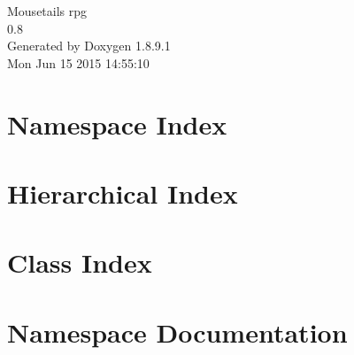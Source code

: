 \documentclass[twoside]{book}
\newcommand{\+}{\discretionary{\mbox{\scriptsize$\hookleftarrow$}}{}{}}
\newcommand{\clearemptydoublepage}{%
  \newpage{\pagestyle{empty}\cleardoublepage}%
}
\begin{document}
\hypersetup{pageanchor=false,
             bookmarks=true,
             bookmarksnumbered=true,
             pdfencoding=unicode
            }
\begin{titlepage}
\vspace*{7cm}
\begin{center}%
{\Large Mousetail\textquotesingle{}s rpg \\[1ex]\large 0.\+8 }\\
\vspace*{1cm}
{\large Generated by Doxygen 1.8.9.1}\\
\vspace*{0.5cm}
{\small Mon Jun 15 2015 14:55:10}\\
\end{center}
\end{titlepage}
\clearemptydoublepage
\tableofcontents
\clearemptydoublepage
{}
\hypersetup{pageanchor=true}

\chapter{Namespace Index}

\chapter{Hierarchical Index}

\chapter{Class Index}

\chapter{Namespace Documentation}















\end{document}
